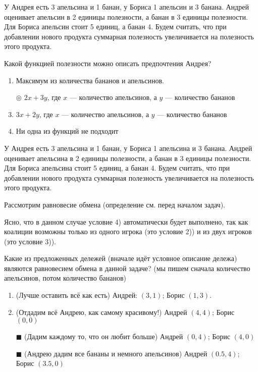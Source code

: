 \task
У Андрея есть 3 апельсина и 1 банан, у Бориса 1 апельсин и 3 банана. Андрей оценивает апельсин в 2 единицы полезности, а банан в 3 единицы полезности. Для Бориса апельсин стоит 5 единиц, а банан 4. Будем считать, что при добавлении нового продукта суммарная полезность увеличивается на полезность этого продукта.

Какой функцией полезности можно описать предпочтения Андрея?

\begin{enumerate}[label=$\circ$]	%
	\item Максимум из количества бананов и апельсинов.
	\item[$\circledcirc$] $2x+3y$, где $x$ --- количество апельсинов, а $y$ --- количество бананов
	\item $3 x + 2y$, где $x$ --- количество апельсинов, а $y$ --- количество бананов
	\item Ни одна из функций не подходит
\end{enumerate}

\task
У Андрея есть 3 апельсина и 1 банан, у Бориса 1 апельсина и 3 банана. Андрей оценивает апельсина в 2 единицы полезности, а банан в 3 единицы полезности. Для Бориса апельсина стоит 5 единиц, а банан 4. Будем считать, что при добавлении нового продукта суммарная полезность увеличивается на полезность этого продукта.

Рассмотрим равновесие обмена (определение см. перед началом задач).

Ясно, что в данном случае условие 4) автоматически будет выполнено, так как коалиции возможны только из одного игрока (это условие 2)) и из двух игроков (это условие 3)).

Какие из предложенных дележей (вначале идёт условное описание дележа) являются равновесием обмена в данной задаче? (мы пишем сначала количество апельсинов, потом количество бананов)

\begin{enumerate}[label=$\square$] %
	\item (Лучше оставить всё как есть) Андрей: $(3,1)$; Борис $(1,3)$.
	\item (Отдадим всё Андрею, как самому красивому!) Андрей $(4,4)$; Борис $(0,0)$
	\item[$\blacksquare$] (Дадим каждому то, что он любит больше) Андрей $(0,4)$; Борис $(4,0)$
	\item[$\blacksquare$] (Андрею дадим все бананы и немного апельсинов) Андрей $(0.5,4)$; Борис $(3.5,0)$
\end{enumerate}

